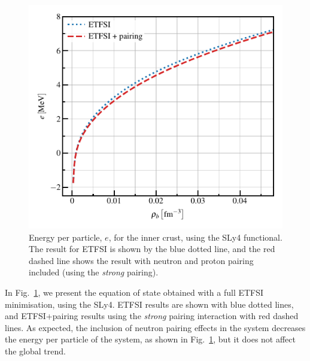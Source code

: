 \documentclass[
    amsmath,amssymb,
    aps,
    prc,
    floatfix,
]{revtex4-2}
\begin{document}
    \begin{figure}
        \centering
        \includegraphics{figs/e_vs_rho.pdf}
        \caption{Energy per particle, $e$, for the inner crust, using the SLy4 functional. The result for ETFSI is shown by the blue dotted line, and the red dashed line shows the result with neutron and proton pairing included (using the \emph{strong} pairing).}
        \label{fig:e_rho}
    \end{figure}

In Fig.~\ref{fig:e_rho}, we present the equation of state obtained with a full ETFSI minimisation, using the SLy4. ETFSI results are shown with blue dotted lines, and ETFSI+pairing results using the \emph{strong} pairing interaction with red dashed lines. As expected, the inclusion of neutron pairing effects in the system decreases the energy per particle of the system, as shown in Fig.~\ref{fig:e_rho}, but it does not affect the global trend.
\end{document}
